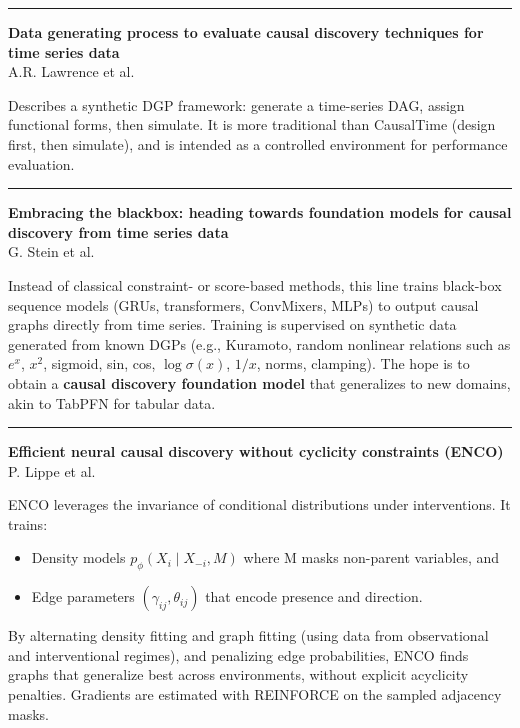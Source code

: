 \documentclass[a5paper]{article}
\providecommand{\tightlist}{%
  \setlength{\itemsep}{0pt}\setlength{\parskip}{0pt}}
\begin{document}
\begin{center}\rule{0.5\linewidth}{0.5pt}\end{center}

\textbf{Data generating process to evaluate causal discovery techniques
for time series data}\\
A.R. Lawrence et al.

Describes a synthetic DGP framework: generate a time-series DAG, assign
functional forms, then simulate. It is more traditional than CausalTime
(design first, then simulate), and is intended as a controlled
environment for performance evaluation.

\begin{center}\rule{0.5\linewidth}{0.5pt}\end{center}

\textbf{Embracing the blackbox: heading towards foundation models for
causal discovery from time series data}\\
G. Stein et al.

Instead of classical constraint- or score-based methods, this line
trains black-box sequence models (GRUs, transformers, ConvMixers, MLPs)
to output causal graphs directly from time series. Training is
supervised on synthetic data generated from known DGPs (e.g., Kuramoto,
random nonlinear relations such as $e^x$, $x^2$, sigmoid, sin, cos, $\log \sigma(x)$,
$1/x$, norms, clamping). The hope is to obtain a \textbf{causal discovery
foundation model} that generalizes to new domains, akin to TabPFN for
tabular data.

\begin{center}\rule{0.5\linewidth}{0.5pt}\end{center}

\textbf{Efficient neural causal discovery without cyclicity constraints
(ENCO)}\\
P. Lippe et al.

ENCO leverages the invariance of conditional distributions under
interventions. It trains:

\begin{itemize}
\tightlist
\item
  Density models $p_\phi(X_i \mid X_{-i}, M)$ where M masks
  non-parent variables, and
\item
  Edge parameters $(\gamma_{ij}, \theta_{ij})$ that encode presence and
  direction.
\end{itemize}

By alternating density fitting and graph fitting (using data from
observational and interventional regimes), and penalizing edge
probabilities, ENCO finds graphs that generalize best across
environments, without explicit acyclicity penalties. Gradients are
estimated with REINFORCE on the sampled adjacency masks.
\end{document}
